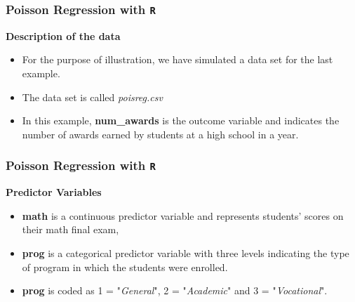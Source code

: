 \documentclass[MASTER.tex]{subfiles}
\begin{document}
\begin{frame}[fragile]

\frametitle{Poisson Regression with \texttt{R}}
\Large
\textbf{Description of the data}

\begin{itemize}
\item For the purpose of illustration, we have simulated a data set for the last example.

\item The data set is called \textit{poisreg.csv}  

\item In this example, \textbf{num\_awards} is the outcome variable and indicates the number of awards earned by students at a high school in a year.

\end{itemize}
\end{frame}
\begin{frame}[fragile]
	
	\frametitle{Poisson Regression with \texttt{R}}
	\Large
	\textbf{Predictor Variables}
\begin{itemize}
\item \textbf{math} is a continuous predictor variable and represents students' scores on their math final exam, \item \textbf{prog} is a categorical predictor variable with three levels indicating the type of program in which the students were enrolled.

\item  \textbf{prog} is coded as 1 = "\textit{General}",
 2 = "\textit{Academic}" and 3 = "\textit{Vocational}". 
\end{itemize}

\end{frame}

%
%
\end{document}
